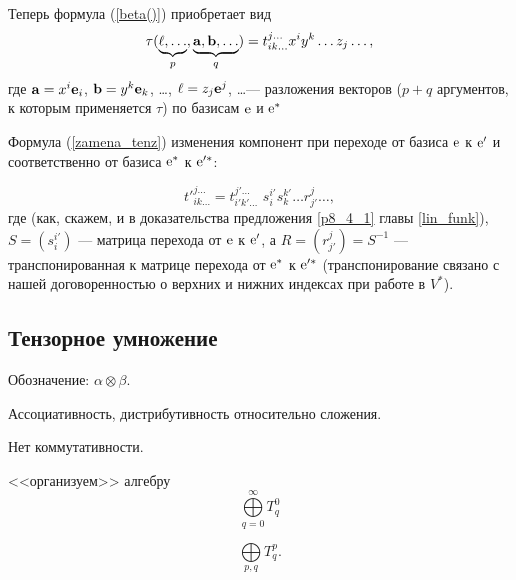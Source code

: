 Теперь формула (\ref{beta()}) приобретает вид
$$\tau (\underbrace{\ell, \ldots }_{p}, \underbrace{\mathbf{a}, 
\mathbf{b}, \ldots }_{q})  = t_{ik \ldots }^{j\ldots } x^iy^k \ldots z_j\ldots , $$
где $\mathbf{a} = x^i\mathbf{e}_i$, $\mathbf{b} = y^k\mathbf{e}_k$, \ldots , $\ell = z_j\mathbf{e}^j$, \ldots ---
разложения векторов ($p+q$ аргументов, к которым применяется $\tau$)  по базисам $\mathrm{e}$ и 
$\mathrm{e}^*$


Формула (\ref{zamena_tenz}) изменения компонент при переходе от базиса $\mathrm{e}$ к 
$\mathrm{e}'$ и соответственно от базиса $\mathrm{e}^*$ к 
$\mathrm{e}'^*$:

$$
\boxed{
{t'}_{ik \ldots }^{j\ldots }  = t_{i'k' \ldots }^{j'\ldots }  \, \,  s^{i'}_i s^{k'}_k\ldots r^j_{j'} \ldots  
},
$$
где (как, скажем, и в доказательства предложения \ref{p8_4_1} главы \ref{lin_funk}),
$S=(s^{i'}_i)$ --- матрица перехода от $\mathrm{e}$ к 
$\mathrm{e}'$, а $R=(r^j_{j'}) = S^{-1}$ --- транспонированная к матрице перехода от 
$\mathrm{e}^*$ к $\mathrm{e}'^*$ (транспонирование связано с нашей договоренностью о
верхних и нижних индексах при работе в $V^*$).




\subsection{Тензорное умножение}


Обозначение: $\alpha \otimes \beta$.

Ассоциативность, дистрибутивность относительно сложения. 

Нет коммутативности.

<<организуем>> алгебру
$$\bigoplus\limits_{q=0}^{\infty} T^0_q$$

$$\bigoplus\limits_{p, q} T^p_q .$$





